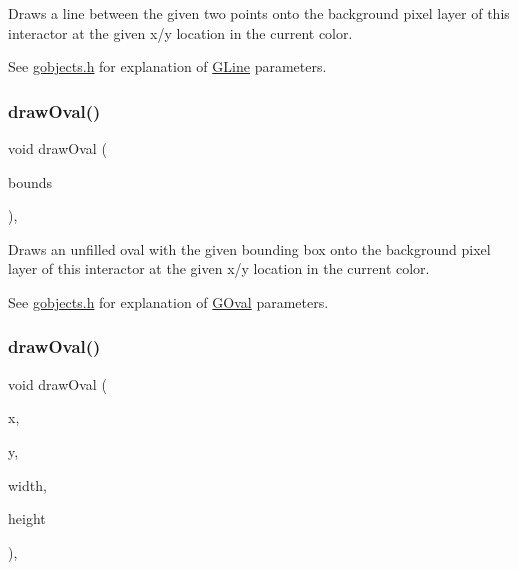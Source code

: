 Draws a line between the given two points onto the background pixel layer of this interactor at the given x/y location in the current color. 

See \mbox{\hyperlink{gobjects_8h_source}{gobjects.\+h}} for explanation of \mbox{\hyperlink{classGLine}{G\+Line}} parameters. \mbox{\label{classGDrawingSurface_a8adc13027efe311b4a6a715205b8bc46}} 
\subsubsection{\texorpdfstring{draw\+Oval()}{drawOval()}\hspace{0.1cm}{\footnotesize\ttfamily [1/2]}}
{\footnotesize\ttfamily void draw\+Oval (\begin{DoxyParamCaption}\item[{const \mbox{\hyperlink{structGRectangle}{G\+Rectangle}} \&}]{bounds }\end{DoxyParamCaption})\hspace{0.3cm}{\ttfamily [virtual]}, {\ttfamily [inherited]}}



Draws an unfilled oval with the given bounding box onto the background pixel layer of this interactor at the given x/y location in the current color. 

See \mbox{\hyperlink{gobjects_8h_source}{gobjects.\+h}} for explanation of \mbox{\hyperlink{classGOval}{G\+Oval}} parameters. \mbox{\label{classGDrawingSurface_aa5b1cf902e578907da3c63060686354e}} 
\subsubsection{\texorpdfstring{draw\+Oval()}{drawOval()}\hspace{0.1cm}{\footnotesize\ttfamily [2/2]}}
{\footnotesize\ttfamily void draw\+Oval (\begin{DoxyParamCaption}\item[{double}]{x,  }\item[{double}]{y,  }\item[{double}]{width,  }\item[{double}]{height }\end{DoxyParamCaption})\hspace{0.3cm}{\ttfamily [virtual]}, {\ttfamily [inherited]}}




